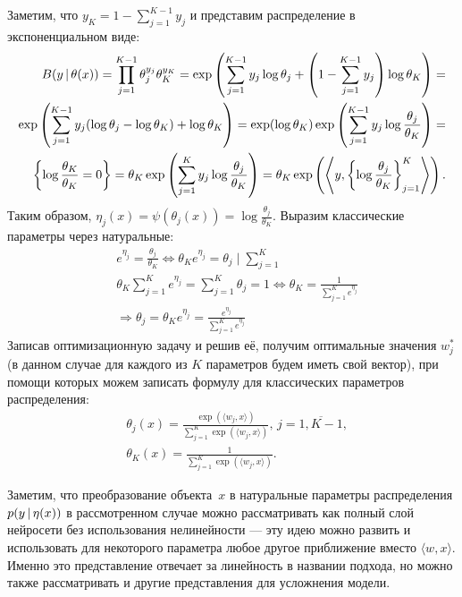 \documentclass[12pt,a4paper]{article}
\begin{document}
    \begin{esSolution}
        Заметим, что $y_K = 1 - \sum_{j=1}^{K-1} y_j$ и представим распределение в экспоненциальном виде:
        \begin{align*}
            B(y \mspace{3mu}{|}\mspace{3mu} \theta(x)) = 
            \prod_{j=1}^{K-1} \theta_j^{y_j} \theta_K^{y_K} = 
            \exp \left(\sum_{j=1}^{K-1} y_j \log \theta_j + \left(1 - \sum_{j=1}^{K-1} y_j \right) \log \theta_K \right) = \\
            \exp \left(\sum_{j=1}^{K-1} y_j (\log \theta_j - \log \theta_K) + \log \theta_K \right) = 
            \exp (\log \theta_K) \exp \left(\sum_{j=1}^{K-1} y_j \log \frac{\theta_j}{\theta_K} \right) =\\ \left\{\log \frac{\theta_K}{\theta_K} = 0\right\} =
            \theta_K \exp \left(\sum_{j=1}^{K} y_j \log \frac{\theta_j}{\theta_K} \right) =
            \theta_K \exp \left(\left\langle y, \left\{\log \frac{\theta_j}{\theta_K} \right\}_{j=1}^K \right\rangle \right).
        \end{align*}
        Таким образом, $\eta_j(x) = \psi(\theta_j(x)) = \log \frac{\theta_j}{\theta_K}.$ Выразим классические параметры через натуральные:
        \begin{align*}
            &e^{\eta_j} = \frac{\theta_j}{\theta_K} \Leftrightarrow \theta_K e^{\eta_j} = \theta_j \mid \sum_{j=1}^K\\
            &\theta_K \sum_{j=1}^K e^{\eta_j} = \sum_{j=1}^K \theta_j = 1 \Leftrightarrow 
            \theta_K = \frac{1}{\sum_{j=1}^K e^{\eta_j}}\\
            &\Rightarrow \theta_j = \theta_K e^{\eta_j} = \frac{e^{\eta_j}}{\sum_{j=1}^K e^{\eta_j}}
        \end{align*}
        Записав оптимизационную задачу и решив её, получим оптимальные значения $w_j^*$ (в данном случае для каждого из $K$ параметров будем иметь свой вектор), при помощи которых можем записать формулу для классических параметров распределения:
        \begin{align*}
            &\theta_j(x) = \frac{\exp(\langle w_j, x \rangle)}{\sum_{j=1}^K \exp(\langle w_j, x \rangle)}, \, j = \overline{1, K-1},\\
            &\theta_K(x) = \frac{1}{\sum_{j=1}^K \exp(\langle w_j, x \rangle)}. 
        \end{align*}
    \end{esSolution}
    
    \par Заметим, что преобразование объекта~$x$ в натуральные параметры распределения $p(y \mspace{3mu}{|}\mspace{3mu} \eta(x))$ в рассмотренном случае можно рассматривать как полный слой нейросети без использования нелинейности — эту идею можно развить и использовать для некоторого параметра любое другое приближение вместо $\langle w, x \rangle$. Именно это представление отвечает за линейность в названии подхода, но можно также рассматривать и другие представления для усложнения модели. 
    
\end{document}
